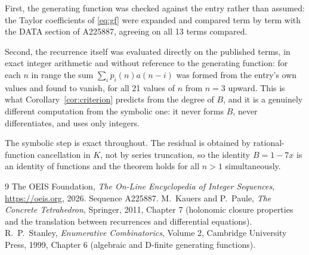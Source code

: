\documentclass[11pt,a4paper]{article}
\theoremstyle{plain}
\theoremstyle{definition}
\begin{document}
First, the generating function was checked against the entry rather than assumed: the
Taylor coefficients of \eqref{eq:gf} were expanded and compared term by term with the DATA
section of A225887, agreeing on all 13 terms compared.

Second, the recurrence itself was evaluated directly on the published terms, in exact
integer arithmetic and without reference to the generating function: for each $n$ in range
the sum $\sum_{i}p_{i}(n)a(n-i)$ was formed from the entry's own values and found to
vanish, for all 21 values of $n$ from $n=3$ upward. This is what
Corollary~\ref{cor:criterion} predicts from the degree of $B$, and it is a genuinely
different computation from the symbolic one: it never forms $B$, never differentiates, and
uses only integers.

The symbolic step is exact throughout. The residual is obtained by rational-function
cancellation in $K$, not by series truncation, so the identity $B=1 - 7 x$ is an
identity of functions and the theorem holds for all $n>1$ simultaneously.

\begin{thebibliography}{9}
 The OEIS Foundation, \emph{The On-Line Encyclopedia of Integer Sequences},
\url{https://oeis.org}, 2026. Sequence A225887.
 M.~Kauers and P.~Paule, \emph{The Concrete Tetrahedron}, Springer, 2011,
Chapter 7 (holonomic closure properties and the translation between recurrences and
differential equations).
 R.~P.~Stanley, \emph{Enumerative Combinatorics}, Volume 2, Cambridge
University Press, 1999, Chapter 6 (algebraic and D-finite generating functions).
\end{thebibliography}
\end{document}
